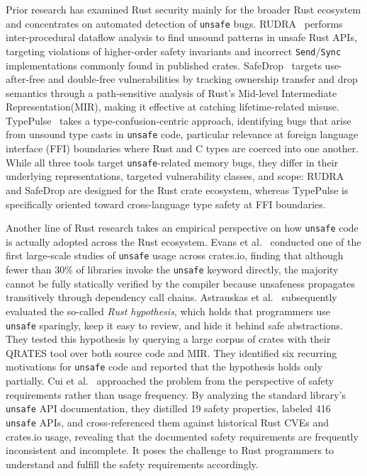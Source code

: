 \documentclass[conference]{IEEEtran}
\begin{document}
Prior research has examined Rust security mainly for the broader Rust ecosystem and concentrates on automated detection of \texttt{unsafe} bugs.
RUDRA~\cite{TODO:bae2021rudra} performs inter-procedural dataflow analysis to find unsound patterns in unsafe Rust APIs, targeting violations of higher-order safety invariants and incorrect \texttt{Send}/\texttt{Sync} implementations commonly found in published crates.
SafeDrop~\cite{TODO:safedrop} targets use-after-free and double-free vulnerabilities by tracking ownership transfer and drop semantics through a path-sensitive analysis of Rust's Mid-level Intermediate Representation(MIR), making it effective at catching lifetime-related misuse.
TypePulse~\cite{TODO:typepulse} takes a type-confusion-centric approach, identifying bugs that arise from unsound type casts in \texttt{unsafe} code, particular relevance at foreign language interface (FFI) boundaries where Rust and C types are coerced into one another.
While all three tools target \texttt{unsafe}-related memory bugs, they differ in their underlying representations, targeted vulnerability classes, and scope: RUDRA and SafeDrop are designed for the Rust crate ecosystem, whereas TypePulse is specifically oriented toward cross-language type safety at FFI boundaries.

Another line of Rust research takes an empirical perspective on how \texttt{unsafe} code is actually adopted across the Rust ecosystem.
Evans et al.~\cite{TODO:evans2020rust} conducted one of the first large-scale studies of \texttt{unsafe} usage across crates.io, finding that although fewer than 30\% of libraries invoke the \texttt{unsafe} keyword directly, the majority cannot be fully statically verified by the compiler because unsafeness propagates transitively through dependency call chains.
Astrauskas et al.~\cite{TODO:astrauskas2020programmers} subsequently evaluated the so-called \emph{Rust hypothesis}, which holds that programmers use \texttt{unsafe} sparingly, keep it easy to review, and hide it behind safe abstractions. They tested this hypothesis by querying a large corpus of crates with their QRATES tool over both source code and MIR. They identified six recurring motivations for \texttt{unsafe} code and reported that the hypothesis holds only partially.
Cui et al.~\cite{TODO:cui2024achilles} approached the problem from the perspective of safety requirements rather than usage frequency. By analyzing the standard library's \texttt{unsafe} API documentation, they distilled 19 safety properties, labeled 416 \texttt{unsafe} APIs, and cross-referenced them against historical Rust CVEs and crates.io usage, revealing that the documented safety requirements are frequently inconsistent and incomplete. It poses the challenge to Rust programmers to understand and fulfill the safety requirements accordingly.
\end{document}

